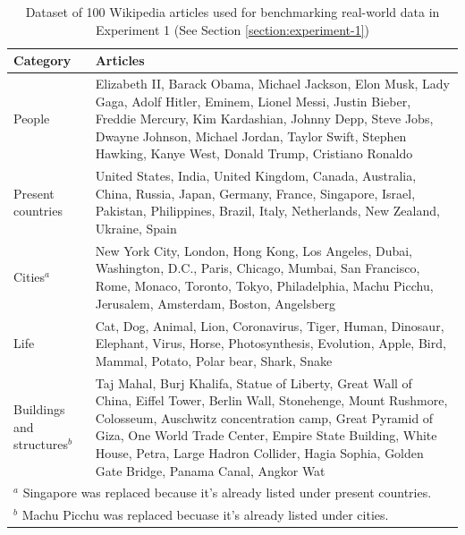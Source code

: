 \documentclass[12pt,oneside]{memoir}
\begin{document}
\begin{table}[ht]
    \centering
    \caption{Dataset of 100 Wikipedia articles used for benchmarking real-world data in Experiment 1 (See Section \ref{section:experiment-1})}
    \label{table:real-world-wikipedia-dataset}
    \begin{tabular}{p{1in}p{4.8in}}
        \toprule
        \textbf{Category} & \textbf{Articles} \\
        \midrule
        People & Elizabeth II, Barack Obama, Michael Jackson, Elon Musk, Lady Gaga, Adolf Hitler, Eminem, Lionel Messi, Justin Bieber, Freddie Mercury, Kim Kardashian, Johnny Depp, Steve Jobs, Dwayne Johnson, Michael Jordan, Taylor Swift, Stephen Hawking, Kanye West, Donald Trump, Cristiano Ronaldo\\
        \midrule
        Present countries & United States, India, United Kingdom, Canada, Australia, China, Russia, Japan, Germany, France, Singapore, Israel, Pakistan, Philippines, Brazil, Italy, Netherlands, New Zealand, Ukraine, Spain\\
        \midrule
        Cities$^a$ & New York City, London, Hong Kong, Los Angeles, Dubai, Washington, D.C., Paris, Chicago, Mumbai, San Francisco, Rome, Monaco, Toronto, Tokyo, Philadelphia, Machu Picchu, Jerusalem, Amsterdam, Boston, Angelsberg\\
        \midrule
        Life & Cat, Dog, Animal, Lion, Coronavirus, Tiger, Human, Dinosaur, Elephant, Virus, Horse, Photosynthesis, Evolution, Apple, Bird, Mammal, Potato, Polar bear, Shark, Snake\\
        \midrule
        Buildings and structures$^b$ & Taj Mahal, Burj Khalifa, Statue of Liberty, Great Wall of China, Eiffel Tower, Berlin Wall, Stonehenge, Mount Rushmore, Colosseum, Auschwitz concentration camp, Great Pyramid of Giza, One World Trade Center, Empire State Building, White House, Petra, Large Hadron Collider, Hagia Sophia, Golden Gate Bridge, Panama Canal, Angkor Wat\\
        \bottomrule
        \multicolumn{2}{l}{\footnotesize $^a$ Singapore was replaced because it's already listed under present countries.}\\
        \multicolumn{2}{l}{\footnotesize $^b$ Machu Picchu was replaced becuase it's already listed under cities.}
    \end{tabular}
\end{table}
\end{document}
